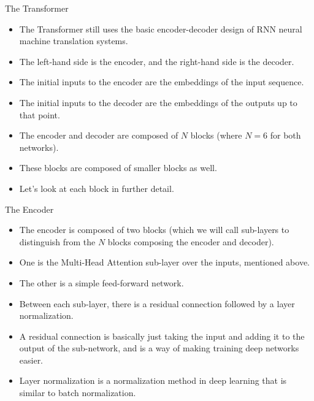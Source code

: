 \documentclass[handout]{beamer}
\begin{document}
\begin{frame}{The Transformer}
\begin{scriptsize}
\begin{itemize}

 \item  The Transformer still uses the basic encoder-decoder design of RNN neural machine translation systems.
 
 \item The left-hand side is the encoder, and the right-hand side is the decoder. 
 
 \item The initial inputs to the encoder are the embeddings of the input sequence.
 \item The initial inputs to the decoder are the embeddings of the outputs up to that point. 
 
 \item The encoder and decoder are composed of $N$ blocks (where $N = 6$ for both networks).
 
 \item These blocks are composed of smaller blocks as well. 
 
 \item Let's look at each block in further detail.
 
\end{itemize}

\end{scriptsize}

\end{frame}



\begin{frame}{The Encoder}
\begin{scriptsize}
\begin{itemize}

 \item  The encoder is composed of two blocks (which we will call sub-layers to distinguish from the $N$ blocks composing the encoder and decoder).
\item  One is the Multi-Head Attention sub-layer over the inputs, mentioned above. 
\item The other is a simple feed-forward network. 
\item Between each sub-layer, there is a residual connection followed by a layer normalization. 

\item A residual connection is basically just taking the input and adding it to the output of the sub-network, and is a way of making training deep networks easier. 

\item Layer normalization is a normalization method in deep learning that is similar to batch normalization.
 
\end{itemize}

\end{scriptsize}

\end{frame}
\end{document}
